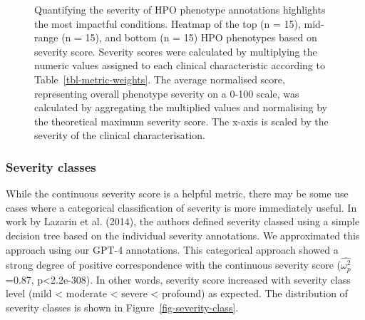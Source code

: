 \documentclass[
]{agujournal2019}
\begin{document}
\label{cell-fig-top-phenos}
\begin{figure}[H]


\caption{\label{fig-top-phenos}Quantifying the severity of HPO phenotype
annotations highlights the most impactful conditions. Heatmap of the top
(n = 15), mid-range (n = 15), and bottom (n = 15) HPO phenotypes based
on severity score. Severity scores were calculated by multiplying the
numeric values assigned to each clinical characteristic according to
Table~\ref{tbl-metric-weights}. The average normalised score,
representing overall phenotype severity on a 0-100 scale, was calculated
by aggregating the multiplied values and normalising by the theoretical
maximum severity score. The x-axis is scaled by the severity of the
clinical characterisation.}

\end{figure}%

\subsubsection{Severity classes}\label{severity-classes}

While the continuous severity score is a helpful metric, there may be
some use cases where a categorical classification of severity is more
immediately useful. In work by Lazarin et al. (2014), the authors
defined severity classed using a simple decision tree based on the
individual severity annotations. We approximated this approach using our
GPT-4 annotations. This categorical approach showed a strong degree of
positive correspondence with the continuous severity score
(\(\hat{\omega_{p}^2}\)=0.87, p\textless2.2e-308). In other words,
severity score increased with severity class level (mild \textless{}
moderate \textless{} severe \textless{} profound) as expected. The
distribution of severity classes is shown in
Figure~\ref{fig-severity-class}.
\end{document}
